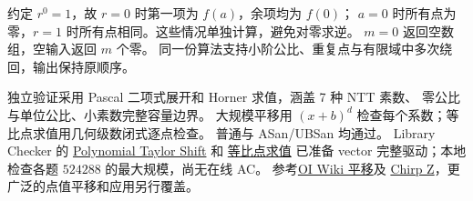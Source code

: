 约定 $r^0=1$，故 $r=0$ 时第一项为 $f(a)$，余项均为 $f(0)$；
$a=0$ 时所有点为零，$r=1$ 时所有点相同。这些情况单独计算，避免对零求逆。
$m=0$ 返回空数组，空输入返回 $m$ 个零。
同一份算法支持小阶公比、重复点与有限域中多次绕回，输出保持原顺序。

独立验证采用 Pascal 二项式展开和 Horner 求值，涵盖 7 种 NTT 素数、
零公比与单位公比、小素数完整容量边界。
大规模平移用 $(x+b)^d$ 检查每个系数；等比点求值用几何级数闭式逐点检查。
普通与 ASan/UBSan 均通过。
Library Checker 的
\href{https://judge.yosupo.jp/problem/polynomial_taylor_shift}{Polynomial Taylor Shift} 和
\href{https://judge.yosupo.jp/problem/multipoint_evaluation_on_geometric_sequence}{等比点求值}
已准备 vector 完整驱动；本地检查各题 $524288$ 的最大规模，尚无在线 AC。
参考\href{https://oi-wiki.org/math/poly/shift/}{OI Wiki 平移}及
\href{https://oi-wiki.org/math/poly/czt/}{Chirp Z}，更广泛的点值平移和应用另行覆盖。

\clearpage
